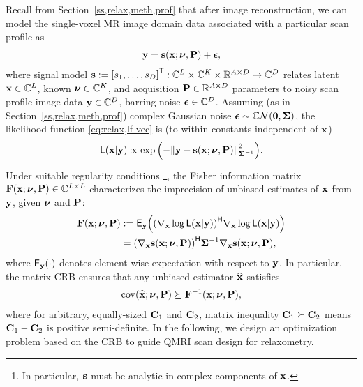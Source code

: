 Recall from Section~\ref{ss,relax,meth,prof}
that after image reconstruction,
we can model the single-voxel MR image domain data
associated with a particular scan profile as 
\begin{align}
	\bmy = \bms\paren{\bmx; \bmnu, \bmP} + \bmeps,
	\label{eq:scn-dsgn,mod-vec-abbrev}
\end{align}
where signal model
$\bms := \brac{s_1, \dots, s_D}\tpose
: \complexes{L} \times \complexes{K} \times \reals{A \times D} \mapsto \complexes{D}$
relates latent $\mathbf{x} \in \mathbb{C}^{L}$,
known $\boldsymbol{\nu} \in \mathbb{C}^{K}$,
and acquisition $\mathbf{P} \in \mathbb{R}^{A \times D}$ parameters
to noisy scan profile image data $\mathbf{y} \in \mathbb{C}^{D}$, 
barring noise $\boldsymbol{\epsilon} \in \mathbb{C}^{D}$.
Assuming (as in Section~\ref{ss,relax,meth,prof})
complex Gaussian noise $\bmeps \sim \cgauss{\mathbf{0}}{\bmSig}$,
the likelihood function \eqref{eq:relax,lf-vec} is
(to within constants independent of $\mathbf{x}$)
\begin{align}
	\Lf{\bmx|\bmy} \propto
		\expa{-\norm{\bmy - \bms\paren{\bmx; \bmnu, \bmP}}^2_{\bmSig^{-1}}}.
	\label{eq:scn-dsgn,lf-vec}
\end{align}
Under suitable regularity conditions
\footnote{In particular,
$\mathbf{s}$ must be analytic in complex components
of $\mathbf{x}$.},
the Fisher information matrix 
$\Fisher{\bmx; \bmnu, \bmP} \in \complexes{L \times L}$
\cite{fisher:1925:tos}
characterizes the imprecision 
of unbiased estimates 
of $\mathbf{x}$ from $\mathbf{y}$, 
given $\boldsymbol{\nu}$ and $\mathbf{P}$:
\begin{align}
	\Fisher{\bmx; \bmnu, \bmP} 
		&:= 
		\expect{\bmy}{\paren{\grada{\bmx} \log{\Lf{\bmx|\bmy}}}\ctpose
		\grada{\bmx} \log{\Lf{\bmx|\bmy}}} 
		\nonumber \\
		&= 
		\paren{\grada{\bmx} \bms\paren{\bmx; \bmnu, \bmP}}\ctpose
		\bmSig^{-1} \grada{\bmx} \bms\paren{\bmx; \bmnu, \bmP}
		\label{eq:scn-dsgn,fisher},
\end{align}
where $\expect{\bmy}{\cdot}$ denotes element-wise expectation
with respect to $\mathbf{y}$.
In particular,
the matrix CRB \cite{cramer:46} ensures
that any unbiased estimator $\widehat{\mathbf{x}}$ satisfies
\begin{align}
	\cov{\est{\bmx}; \bmnu, \bmP} \succeq
		\bmF^{-1}\paren{\bmx; \bmnu, \bmP},
		\label{eq:scn-dsgn,crb}
\end{align}
where for arbitrary, equally-sized $\mathbf{C}_{1}$ and $\mathbf{C}_{2}$,
matrix inequality $\mathbf{C}_{1} \succeq \mathbf{C}_{2}$ 
means $\mathbf{C}_{1}-\mathbf{C}_{2}$ is positive semi-definite.
In the following,
we design an optimization problem 
based on the CRB
to guide QMRI scan design 
for relaxometry.

